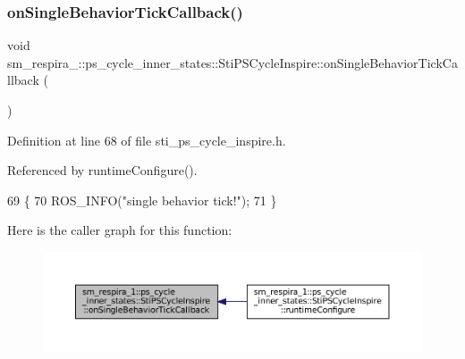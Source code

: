 \subsubsection{\texorpdfstring{on\+Single\+Behavior\+Tick\+Callback()}{onSingleBehaviorTickCallback()}}
{\footnotesize\ttfamily void sm\+\_\+respira\+\_\+::ps\+\_\+cycle\+\_\+inner\+\_\+states\+::\+Sti\+P\+S\+Cycle\+Inspire\+::on\+Single\+Behavior\+Tick\+Callback (\begin{DoxyParamCaption}{ }\end{DoxyParamCaption})\hspace{0.3cm}{\ttfamily [inline]}}



Definition at line 68 of file sti\+\_\+ps\+\_\+cycle\+\_\+inspire.\+h.



Referenced by runtime\+Configure().


\begin{DoxyCode}
69   \{
70     ROS\_INFO(\textcolor{stringliteral}{"single behavior tick!"});
71   \}
\end{DoxyCode}
Here is the caller graph for this function\+:
\nopagebreak
\begin{figure}[H]
\begin{center}
\leavevmode
\includegraphics[width=350pt]{structsm__respira__1_1_1ps__cycle__inner__states_1_1StiPSCycleInspire_ad95cb458b90dcbb2402b8e890f4b027d_icgraph}
\end{center}
\end{figure}
\mbox{\label{structsm__respira__1_1_1ps__cycle__inner__states_1_1StiPSCycleInspire_a2bc93095187e5dac5c21cb899555678c}} 
